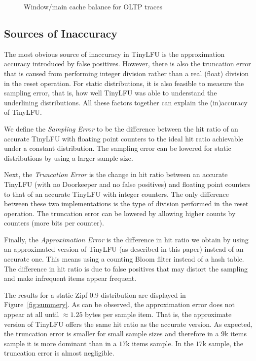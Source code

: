 \documentclass[10pt,a4paper]{article}
\begin{document}
\begin{figure}[t]
 	\caption{Window/main cache balance for OLTP traces}
 	\label{fig:oltpWindowCache}
\end{figure}



\subsection{Sources of Inaccuracy}
\label{sec:error}

The most obvious source of inaccuracy in TinyLFU is the approximation accuracy introduced by false positives.
However, there is also the truncation error that is caused from performing integer division rather than a real (float) division in the reset operation.
For static distributions, it is also feasible to measure the sampling error, that is, how well TinyLFU was able to understand the underlining distributions.
All these factors together can explain the (in)accuracy of TinyLFU.

We define the \emph{Sampling Error} to be the difference between the hit ratio of an accurate TinyLFU with floating point counters to the ideal hit ratio achievable under a constant distribution.
The sampling error can be lowered for static distributions by using a larger sample size.

Next, the \emph{Truncation Error} is the change in hit ratio between an accurate TinyLFU (with no Doorkeeper and no false positives) and floating point counters to that of an accurate TinyLFU with integer counters.
The only difference between these two implementations is the type of division performed in the reset operation.
The truncation error can be lowered by allowing higher counts by counters (more bits per counter).

Finally, the \emph{Approximation Error} is the difference in hit ratio we obtain by using an approximated version of TinyLFU (as described in this paper) instead of an accurate one.
This means using a counting Bloom filter instead of a hash table.
The difference in hit ratio is due to false positives that may distort the sampling and make infrequent items appear frequent.

The results for a static Zipf 0.9 distribution are displayed in Figure~\ref{fig:summery}.
As can be observed, the approximation error does not appear at all until $\approx 1.25$ bytes per sample item.
That is, the approximate version of TinyLFU offers the same hit ratio as the accurate version.
As expected, the truncation error is smaller for small sample sizes and therefore in a $9$k items sample it is more dominant than in a $17$k items sample.
In the $17$k sample, the truncation error is almost negligible.
\end{document}

